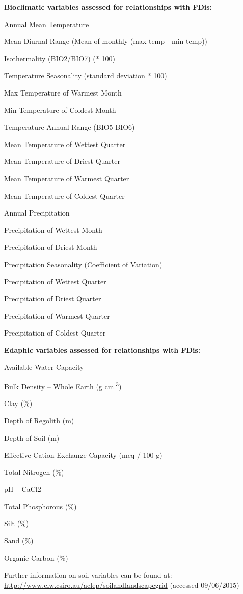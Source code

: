 \textbf{Bioclimatic variables assessed for relationships with FDis:}

\small{Annual Mean Temperature

Mean Diurnal Range (Mean of monthly (max temp - min temp))

Isothermality (BIO2/BIO7) (* 100)

Temperature Seasonality (standard deviation * 100)

Max Temperature of Warmest Month

Min Temperature of Coldest Month

Temperature Annual Range (BIO5-BIO6)

Mean Temperature of Wettest Quarter

Mean Temperature of Driest Quarter

Mean Temperature of Warmest Quarter

Mean Temperature of Coldest Quarter

Annual Precipitation

Precipitation of Wettest Month

Precipitation of Driest Month

Precipitation Seasonality (Coefficient of Variation)

Precipitation of Wettest Quarter

Precipitation of Driest Quarter

Precipitation of Warmest Quarter

Precipitation of Coldest Quarter}

\newpage

\textbf{Edaphic variables assessed for relationships with FDis:}

\small{Available Water Capacity

Bulk Density – Whole Earth (g cm\textsuperscript{-3})

Clay (\%)

Depth of Regolith (m)

Depth of Soil (m)

Effective Cation Exchange Capacity (meq / 100 g)

Total Nitrogen (\%)

pH – CaCl2 

Total Phosphorous (\%)

Silt (\%)

Sand (\%)

Organic Carbon (\%)}

\newline
Further information on soil variables can be found at: \newline
\url{http://www.clw.csiro.au/aclep/soilandlandscapegrid} (accessed 09/06/2015)
